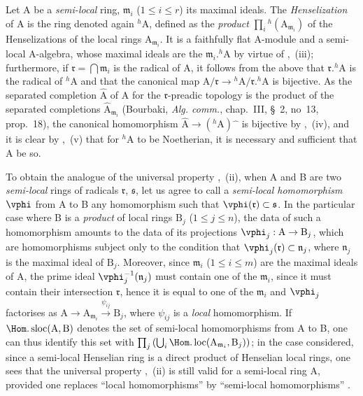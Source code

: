 \begin{env}[18.6.7]
\label{IV.18.6.7}
Let A be a \emph{semi-local} ring, $\mathfrak{m}_i$ ($1\leq i\leq r$) its maximal ideals.
The \emph{Henselization} of A is the ring denoted again ${}^h\!\mathrm{A}$, defined as the \emph{product} $\prod_i{}^h(\mathrm{A}_{\mathfrak{m}_i})$ of the Henselizations of the local rings $\mathrm{A}_{\mathfrak{m}_i}$.
It is a faithfully flat A-module and a semi-local A-algebra, whose maximal ideals are the $\mathfrak{m}_i.{}^h\!\mathrm{A}$ by virtue of ,~(iii);
furthermore, if $\mathfrak{r}=\bigcap\mathfrak{m}_i$ is the radical of A, it follows from the above that $\mathfrak{r}.{}^h\!\mathrm{A}$
is the radical of ${}^h\!\mathrm{A}$ and that the canonical map $\mathrm{A}/\mathfrak{r}\to{}^h\!\mathrm{A}/\mathfrak{r}.{}^h\!\mathrm{A}$ is bijective.
As the separated completion $\hat{\mathrm{A}}$ of A for the $\mathfrak{r}$-preadic topology is the product of the separated completions $\hat{\mathrm{A}}_{\mathfrak{m}_i}$ (Bourbaki, \emph{Alg. comm.}, chap.~III, \S~2, no~13, prop.~18), the canonical homomorphism $\hat{\mathrm{A}}\to({}^h\!\mathrm{A})\hat{\phantom{x}}$ is bijective by ,~(iv), and it is clear by ,~(v) that for ${}^h\!\mathrm{A}$ to be Noetherian, it is necessary and sufficient that A be so.

To obtain the analogue of the universal property ,~(ii), when A and B are two \emph{semi-local} rings of radicals $\mathfrak{r}$, $\mathfrak{s}$, let us agree to call a \emph{semi-local homomorphism} $\vphi$ from A to B any homomorphism such that $\vphi(\mathfrak{r})\subset\mathfrak{s}$.
In the particular case where B is a \emph{product} of local rings $\mathrm{B}_j$ ($1\leq j\leq n$), the data of such a homomorphism amounts to the data of its projections $\vphi_j:\mathrm{A}\to\mathrm{B}_j$, which are homomorphisms subject only to the condition that $\vphi_j(\mathfrak{r})\subset\mathfrak{n}_j$, where $\mathfrak{n}_j$ is the maximal ideal of $\mathrm{B}_j$.
Moreover, since $\mathfrak{m}_i$ ($1\leq i\leq m$) are the maximal ideals of A, the prime ideal $\vphi_j^{-1}(\mathfrak{n}_j)$ must contain one of the $\mathfrak{m}_i$, since it must contain their intersection $\mathfrak{r}$, hence it is equal to one of the $\mathfrak{m}_i$ and $\vphi_j$ factorises as $\mathrm{A}\to\mathrm{A}_{\mathfrak{m}_i}\xrightarrow{\psi_{ij}}\mathrm{B}_j$, where $\psi_{ij}$ is a \emph{local} homomorphism.
If $\Hom.\operatorname{sloc}(\mathrm{A},\mathrm{B})$ denotes the set of semi-local homomorphisms from A to B, one can thus identify this set with $\prod_j\left(\bigcup_i\Hom.\operatorname{loc}(\mathrm{A}_{\mathfrak{m}_i},\mathrm{B}_j)\right)$;
in the case considered, since a semi-local Henselian ring is a direct product of Henselian local rings, one sees that the universal property ,~(ii) is still valid for a semi-local ring A, provided one replaces ``local homomorphisms'' by ``semi-local homomorphisms'' .
\end{env}

